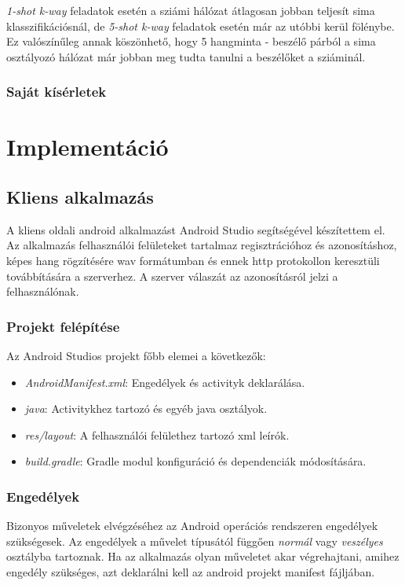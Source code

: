 \emph{1-shot k-way} feladatok esetén a sziámi hálózat átlagosan jobban teljesít sima klasszifikációsnál, de \emph{5-shot k-way} feladatok esetén már az utóbbi kerül fölénybe. Ez valószínűleg annak köszönhető, hogy 5 hangminta - beszélő párból a sima osztályozó hálózat már jobban meg tudta tanulni a beszélőket a sziáminál.

\subsubsection{Saját kísérletek}

\section{Implementáció}

\subsection{Kliens alkalmazás}

A kliens oldali android alkalmazást Android Studio segítségével készítettem el. Az alkalmazás felhasználói felületeket tartalmaz regisztrációhoz és azonosításhoz, képes hang rögzítésére wav formátumban és ennek http protokollon keresztüli továbbítására a szerverhez. A szerver válaszát az azonosításról jelzi a felhasználónak. 

\subsubsection{Projekt felépítése}

Az Android Studios projekt főbb elemei a következők:

\begin{itemize}
	\item \emph{AndroidManifest.xml}: Engedélyek és activityk deklarálása.
	\item \emph{java}: Activitykhez tartozó és egyéb java osztályok.
	\item \emph{res/layout}: A felhasználói felülethez tartozó xml leírók.
	\item \emph{build.gradle}: Gradle modul konfiguráció és dependenciák módosítására.
\end{itemize}

\subsubsection{Engedélyek}

Bizonyos műveletek elvégzéséhez az Android operációs rendszeren engedélyek szükségesek. Az engedélyek a művelet típusától függően \emph{normál} vagy \emph{veszélyes} osztályba tartoznak. Ha az alkalmazás olyan műveletet akar végrehajtani, amihez engedély szükséges, azt deklarálni kell az android projekt manifest fájljában.

